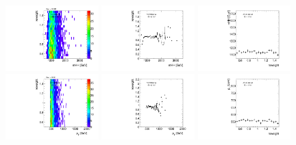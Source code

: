 \begin{figure}[htbp!]
\begin{center}
\includegraphics[angle=270, width=0.32\textwidth]{./figures/boosted/AppendixReweight/Weights/4Trk_Sideband_mHH_l_weight.pdf}
\includegraphics[angle=270, width=0.32\textwidth]{./figures/boosted/AppendixReweight/Weights/4Trk_Sideband_mHH_l_weight_profx.pdf}
\includegraphics[angle=270, width=0.32\textwidth]{./figures/boosted/AppendixReweight/Weights/4Trk_Sideband_mHH_l_weight_profy.pdf}\\
\includegraphics[angle=270, width=0.32\textwidth]{./figures/boosted/AppendixReweight/Weights/4Trk_Sideband_leadHCand_Pt_m_weight.pdf}
\includegraphics[angle=270, width=0.32\textwidth]{./figures/boosted/AppendixReweight/Weights/4Trk_Sideband_leadHCand_Pt_m_weight_profx.pdf}
\includegraphics[angle=270, width=0.32\textwidth]{./figures/boosted/AppendixReweight/Weights/4Trk_Sideband_leadHCand_Pt_m_weight_profy.pdf}\\

\end{center}
\end{figure}
